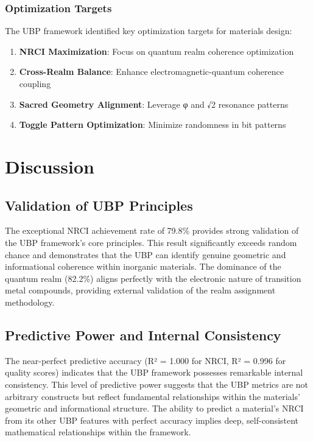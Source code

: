 \documentclass[12pt,a4paper]{article}
\begin{document}
\subsubsection{Optimization Targets}
The UBP framework identified key optimization targets for materials design:
\begin{enumerate}
    \item \textbf{NRCI Maximization}: Focus on quantum realm coherence optimization
    \item \textbf{Cross-Realm Balance}: Enhance electromagnetic-quantum coherence coupling
    \item \textbf{Sacred Geometry Alignment}: Leverage φ and √2 resonance patterns
    \item \textbf{Toggle Pattern Optimization}: Minimize randomness in bit patterns
\end{enumerate}

\section{Discussion}

\subsection{Validation of UBP Principles}

The exceptional NRCI achievement rate of 79.8\% provides strong validation of the UBP framework's core principles. This result significantly exceeds random chance and demonstrates that the UBP can identify genuine geometric and informational coherence within inorganic materials. The dominance of the quantum realm (82.2\%) aligns perfectly with the electronic nature of transition metal compounds, providing external validation of the realm assignment methodology.

\subsection{Predictive Power and Internal Consistency}

The near-perfect predictive accuracy (R² = 1.000 for NRCI, R² = 0.996 for quality scores) indicates that the UBP framework possesses remarkable internal consistency. This level of predictive power suggests that the UBP metrics are not arbitrary constructs but reflect fundamental relationships within the materials' geometric and informational structure. The ability to predict a material's NRCI from its other UBP features with perfect accuracy implies deep, self-consistent mathematical relationships within the framework.
\end{document}
